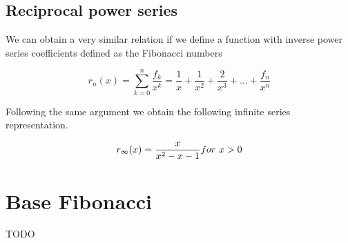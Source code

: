 \documentclass[a4paper]{article}
\begin{document}
\subsection{Reciprocal power series}
We can obtain a very similar relation if we define a function with inverse power series coefficients defined as the Fibonacci numbers

\begin{equation}
r_n(x) = \sum_{k=0}^{n} \frac{f_k}{x^k} = \frac{1}{x} + \frac{1}{x^2} + \frac{2}{x^3} + ... + \frac{f_n}{x^n}
\end{equation}

Following the same argument we obtain the following infinite series representation.

\begin{equation}
r_{\infty}(x) = \frac{x}{x^2 - x - 1} for \ x>0 \\ 
\end{equation}


\section{Base Fibonacci}
TODO
\end{document}
